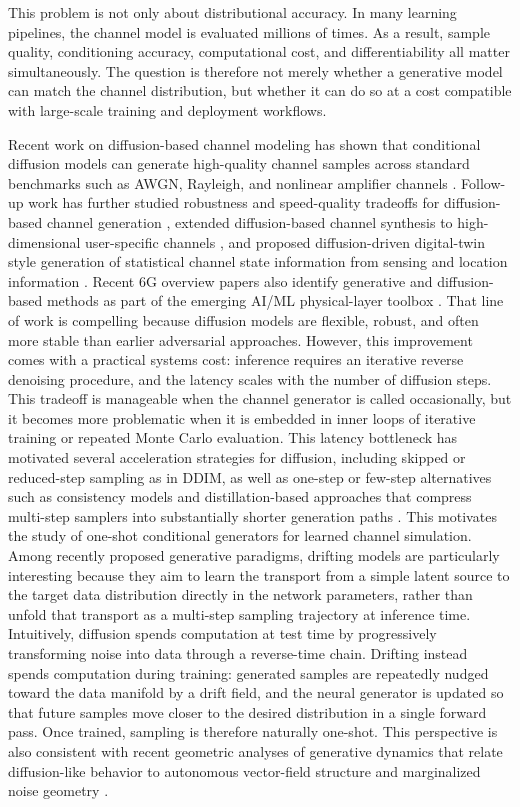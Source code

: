 \documentclass[conference]{IEEEtran}
\begin{document}
This problem is not only about distributional accuracy.
In many learning pipelines, the channel model is evaluated millions of times.
As a result, sample quality, conditioning accuracy, computational cost, and differentiability all matter simultaneously.
The question is therefore not merely whether a generative model can match the channel distribution, but whether it can do so at a cost compatible with large-scale training and deployment workflows.

Recent work on diffusion-based channel modeling has shown that conditional diffusion models can generate high-quality channel samples across standard benchmarks such as AWGN, Rayleigh, and nonlinear amplifier channels \cite{paper2309}.
Follow-up work has further studied robustness and speed-quality tradeoffs for diffusion-based channel generation \cite{kimicc2024}, extended diffusion-based channel synthesis to high-dimensional user-specific channels \cite{lee2024highdimchannels}, and proposed diffusion-driven digital-twin style generation of statistical channel state information from sensing and location information \cite{gong2025dtoc}.
Recent 6G overview papers also identify generative and diffusion-based methods as part of the emerging AI/ML physical-layer toolbox \cite{banerjee2026phyanna,roessler2026aiml6g}.
That line of work is compelling because diffusion models are flexible, robust, and often more stable than earlier adversarial approaches.
However, this improvement comes with a practical systems cost: inference requires an iterative reverse denoising procedure, and the latency scales with the number of diffusion steps.
This tradeoff is manageable when the channel generator is called occasionally, but it becomes more problematic when it is embedded in inner loops of iterative training or repeated Monte Carlo evaluation. This latency bottleneck has motivated several acceleration strategies for diffusion, including skipped or reduced-step sampling as in DDIM, as well as one-step or few-step alternatives such as consistency models and distillation-based approaches that compress multi-step samplers into substantially shorter generation paths \cite{ddim,song2023consistency,yin2024onestep}.
This motivates the study of one-shot conditional generators for learned channel simulation.
Among recently proposed generative paradigms, drifting models \cite{drifting} are particularly interesting because they aim to learn the transport from a simple latent source to the target data distribution directly in the network parameters, rather than unfold that transport as a multi-step sampling trajectory at inference time.
Intuitively, diffusion spends computation at test time by progressively transforming noise into data through a reverse-time chain.
Drifting instead spends computation during training: generated samples are repeatedly nudged toward the data manifold by a drift field, and the neural generator is updated so that future samples move closer to the desired distribution in a single forward pass.
Once trained, sampling is therefore naturally one-shot.
This perspective is also consistent with recent geometric analyses of generative dynamics that relate diffusion-like behavior to autonomous vector-field structure and marginalized noise geometry \cite{geometryofnoise}.
\end{document}
